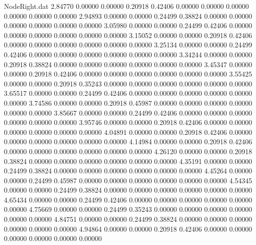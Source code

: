 \begin{filecontents}{NodeRight.dat}
   2.84770    0.00000    0.00000     0.20918    0.42406    0.00000    0.00000    0.00000    0.00000    0.00000    0.00000
   2.94893    0.00000    0.00000     0.24499    0.38824    0.00000    0.00000    0.00000    0.00000    0.00000    0.00000
   3.05980    0.00000    0.00000     0.24499    0.42406    0.00000    0.00000    0.00000    0.00000    0.00000    0.00000
   3.15052    0.00000    0.00000     0.20918    0.42406    0.00000    0.00000    0.00000    0.00000    0.00000    0.00000
   3.25134    0.00000    0.00000     0.24499    0.42406    0.00000    0.00000    0.00000    0.00000    0.00000    0.00000
   3.34244    0.00000    0.00000     0.20918    0.38824    0.00000    0.00000    0.00000    0.00000    0.00000    0.00000
   3.45347    0.00000    0.00000     0.20918    0.42406    0.00000    0.00000    0.00000    0.00000    0.00000    0.00000
   3.55425    0.00000    0.00000     0.20918    0.35243    0.00000    0.00000    0.00000    0.00000    0.00000    0.00000
   3.65517    0.00000    0.00000     0.24499    0.42406    0.00000    0.00000    0.00000    0.00000    0.00000    0.00000
   3.74586    0.00000    0.00000     0.20918    0.45987    0.00000    0.00000    0.00000    0.00000    0.00000    0.00000
   3.85667    0.00000    0.00000     0.24499    0.42406    0.00000    0.00000    0.00000    0.00000    0.00000    0.00000
   3.95746    0.00000    0.00000     0.20918    0.42406    0.00000    0.00000    0.00000    0.00000    0.00000    0.00000
   4.04891    0.00000    0.00000     0.20918    0.42406    0.00000    0.00000    0.00000    0.00000    0.00000    0.00000
   4.14984    0.00000    0.00000     0.20918    0.42406    0.00000    0.00000    0.00000    0.00000    0.00000    0.00000
   4.26120    0.00000    0.00000     0.20918    0.38824    0.00000    0.00000    0.00000    0.00000    0.00000    0.00000
   4.35191    0.00000    0.00000     0.24499    0.38824    0.00000    0.00000    0.00000    0.00000    0.00000    0.00000
   4.45264    0.00000    0.00000     0.24499    0.45987    0.00000    0.00000    0.00000    0.00000    0.00000    0.00000
   4.54345    0.00000    0.00000     0.24499    0.38824    0.00000    0.00000    0.00000    0.00000    0.00000    0.00000
   4.65434    0.00000    0.00000     0.24499    0.42406    0.00000    0.00000    0.00000    0.00000    0.00000    0.00000
   4.75669    0.00000    0.00000     0.24499    0.35243    0.00000    0.00000    0.00000    0.00000    0.00000    0.00000
   4.84751    0.00000    0.00000     0.24499    0.38824    0.00000    0.00000    0.00000    0.00000    0.00000    0.00000
   4.94864    0.00000    0.00000     0.20918    0.42406    0.00000    0.00000    0.00000    0.00000    0.00000    0.00000

\end{filecontents}
